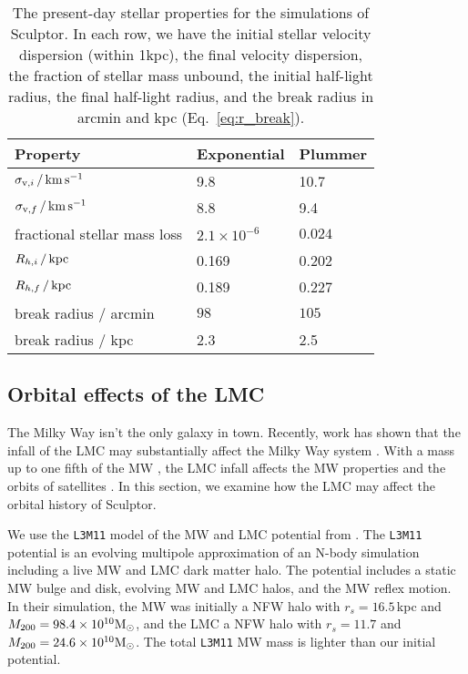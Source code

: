 \begin{table*}[t]
\centering
\caption[Simulation results for Sculptor’s stars]{The present-day stellar properties for the simulations of Sculptor. In each row, we have the initial stellar velocity dispersion (within 1kpc), the final velocity dispersion, the fraction of stellar mass unbound, the initial half-light radius, the final half-light radius, and the break radius in arcmin and kpc (Eq. \ref{eq:r_break}). }
\label{tbl:scl_sim_stars_results}
\begin{tabular}{lll}
\toprule
Property & Exponential & Plummer\\
\midrule
$\sigma_{{\rm v}, i}\,/\,{\rm km\,s^{-1}}$ & 9.8 & 10.7\\
$\sigma_{{\rm v}, f} \,/\,{\rm km\,s^{-1}}$ & 8.8 & 9.4\\
fractional stellar mass loss & $2.1\times 10^{-6}$ & $0.024$\\
$R_{h, i}\,/\,{\rm kpc}$ & 0.169 & 0.202\\
$R_{h, f}\,/\,{\rm kpc}$ & 0.189 & 0.227\\
break radius / arcmin & $98$ & $105$\\
break radius / kpc & 2.3 & 2.5\\
\bottomrule
\end{tabular}
\end{table*}

\subsection{Orbital effects of the LMC}\label{sec:scl_lmc}

The Milky Way isn't the only galaxy in town. Recently, work has shown
that the infall of the LMC may substantially affect the Milky Way system
\citep[e.g.,][]{erkal+2019, cautun+2019, garavito-camargo+2021, vasiliev2023}.
With a mass up to one fifth of the MW \citep[e.g.,][]{penarrubia+2015},
the LMC infall affects the MW properties and the orbits of satellites
\citep[see
e.g.,][]{patel+2020, battaglia+2022, correamagnus+vasiliev2022}. In this
section, we examine how the LMC may affect the orbital history of
Sculptor.

We use the \texttt{L3M11} model of the MW and LMC potential from
\citet{vasiliev2024}. The \texttt{L3M11} potential is an evolving
multipole approximation of an N-body simulation including a live MW and
LMC dark matter halo. The potential includes a static MW bulge and disk,
evolving MW and LMC halos, and the MW reflex motion. In their
simulation, the MW was initially a NFW halo with \(r_s=16.5\,\)kpc and
\(M_{\rm 200}= 98.4\times10^{10}{\rm M}_{\odot}\), and the LMC a NFW halo with
\(r_s=11.7\) and \(M_{200} = 24.6 \times 10^{10} {\rm M}_{\odot}\). The total
\texttt{L3M11} MW mass is lighter than our initial \citet{EP2020}
potential.

